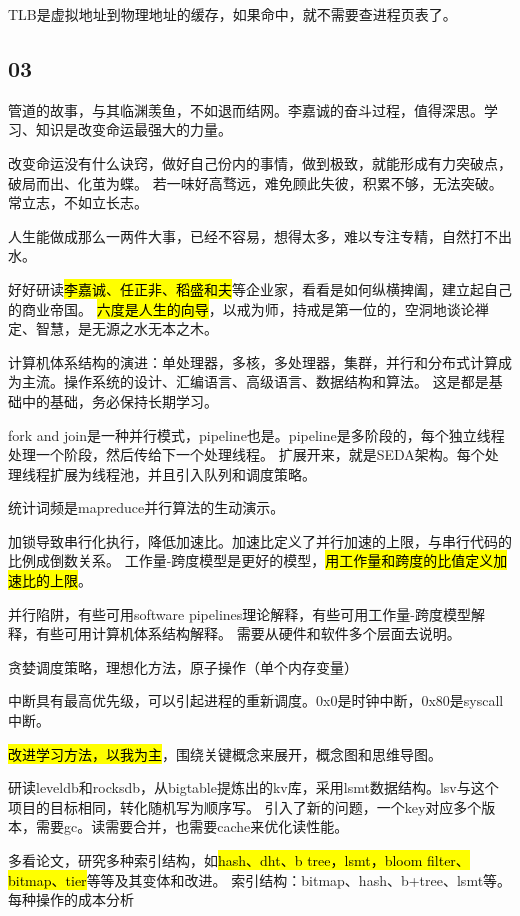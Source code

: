 TLB是虚拟地址到物理地址的缓存，如果命中，就不需要查进程页表了。

\subsection{03}

管道的故事，与其临渊羡鱼，不如退而结网。李嘉诚的奋斗过程，值得深思。学习、知识是改变命运最强大的力量。

改变命运没有什么诀窍，做好自己份内的事情，做到极致，就能形成有力突破点，破局而出、化茧为蝶。
若一味好高骛远，难免顾此失彼，积累不够，无法突破。常立志，不如立长志。

人生能做成那么一两件大事，已经不容易，想得太多，难以专注专精，自然打不出水。

好好研读\hl{李嘉诚、任正非、稻盛和夫}等企业家，看看是如何纵横捭阖，建立起自己的商业帝国。
\hl{六度是人生的向导}，以戒为师，持戒是第一位的，空洞地谈论禅定、智慧，是无源之水无本之木。

计算机体系结构的演进：单处理器，多核，多处理器，集群，并行和分布式计算成为主流。操作系统的设计、汇编语言、高级语言、数据结构和算法。
这是都是基础中的基础，务必保持长期学习。

fork and join是一种并行模式，pipeline也是。pipeline是多阶段的，每个独立线程处理一个阶段，然后传给下一个处理线程。
扩展开来，就是SEDA架构。每个处理线程扩展为线程池，并且引入队列和调度策略。

统计词频是mapreduce并行算法的生动演示。

加锁导致串行化执行，降低加速比。加速比定义了并行加速的上限，与串行代码的比例成倒数关系。
工作量-跨度模型是更好的模型，\hl{用工作量和跨度的比值定义加速比的上限}。

并行陷阱，有些可用software pipelines理论解释，有些可用工作量-跨度模型解释，有些可用计算机体系结构解释。
需要从硬件和软件多个层面去说明。

贪婪调度策略，理想化方法，原子操作（单个内存变量）

中断具有最高优先级，可以引起进程的重新调度。0x0是时钟中断，0x80是syscall中断。

\hl{改进学习方法，以我为主}，围绕关键概念来展开，概念图和思维导图。

研读leveldb和rocksdb，从bigtable提炼出的kv库，采用lsmt数据结构。lsv与这个项目的目标相同，转化随机写为顺序写。
引入了新的问题，一个key对应多个版本，需要gc。读需要合并，也需要cache来优化读性能。

多看论文，研究多种索引结构，如\hl{hash、dht、b tree，lsmt，bloom filter、bitmap、tier}等等及其变体和改进。
索引结构：bitmap、hash、b+tree、lsmt等。每种操作的成本分析

